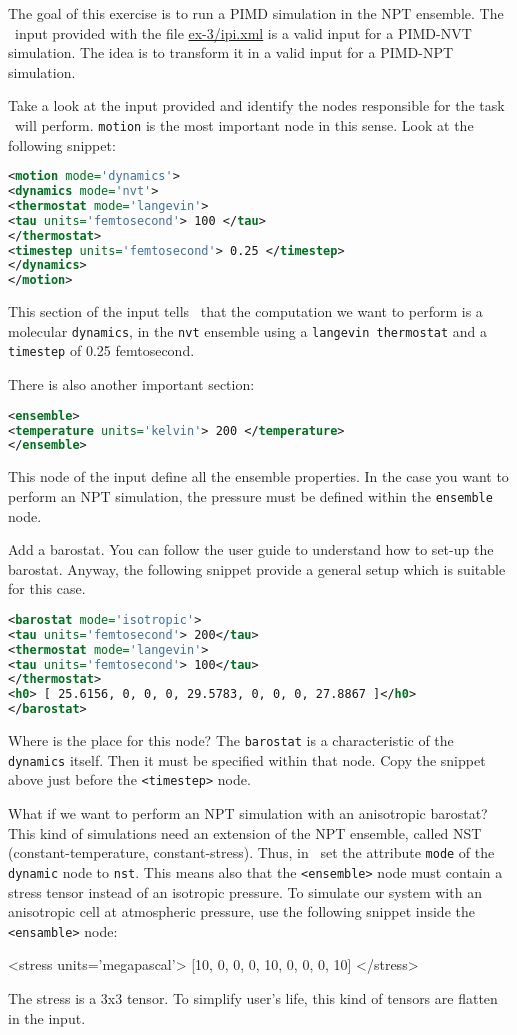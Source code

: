 \documentclass{article}
\begin{document}
\begin{Exercise}[label={inputs},title={PIMD-NPT simulation of ice}]
The goal of this exercise is to run a PIMD simulation in the NPT
ensemble. The \ipi\ input provided with the file \url{ex-3/ipi.xml} is
a valid input for a PIMD-NVT simulation. The idea is to transform it
in a valid input for a PIMD-NPT simulation.

\Question
Take a look at the input provided and identify the nodes responsible
for the task \ipi\ will perform.
\texttt{motion} is the most important node in this sense.
Look at the following snippet:
\begin{lstlisting}[language=xml]
<motion mode='dynamics'>
<dynamics mode='nvt'>
<thermostat mode='langevin'>
<tau units='femtosecond'> 100 </tau>
</thermostat>
<timestep units='femtosecond'> 0.25 </timestep>
</dynamics>
</motion>
\end{lstlisting}
This section of the input tells \ipi\ that the computation we want to
perform is a molecular \texttt{dynamics}, in the \texttt{nvt} ensemble
using a \texttt{langevin thermostat} and a \texttt{timestep} of 0.25
femtosecond.

There is also another important section:
\begin{lstlisting}[language=xml]
<ensemble>
<temperature units='kelvin'> 200 </temperature>
</ensemble>
\end{lstlisting}
This node of the input define all the ensemble properties. In the
case you want to perform an NPT simulation, the pressure must be
defined within the \texttt{ensemble} node.


\Question
Add a barostat. You can follow the user guide to understand how to
set-up the barostat. Anyway, the following snippet provide a general setup
which is suitable for this case.
\begin{lstlisting}[language=xml]
<barostat mode='isotropic'>
<tau units='femtosecond'> 200</tau>
<thermostat mode='langevin'>
<tau units='femtosecond'> 100</tau>
</thermostat>
<h0> [ 25.6156, 0, 0, 0, 29.5783, 0, 0, 0, 27.8867 ]</h0>
</barostat>
\end{lstlisting}
Where is the place for this node? The \texttt{barostat} is a
characteristic of the \texttt{dynamics} itself. Then it must be
specified within that node. Copy the snippet above just before the
\texttt{<timestep>} node.


\Question What if we want to perform an NPT simulation with an
anisotropic barostat? This kind of simulations need an extension of
the NPT ensemble, called NST (constant-temperature,
constant-stress). Thus, in \ipi\ set the attribute \texttt{mode} of
the \texttt{dynamic} node to \texttt{nst}. This means also that the
\texttt{<ensemble>} node must contain a stress tensor instead of an
isotropic pressure. To simulate our system with an anisotropic cell at
atmospheric pressure, use the following snippet inside the
\texttt{<ensamble>} node:
\begin{lstlisgin}[language=xml]
<stress units='megapascal'> [10, 0, 0, 0, 10, 0, 0, 0, 10] </stress>
\end{lstlisgin}
The stress is a 3x3 tensor. To simplify user's life, this kind of tensors are 
flatten in the \ipi input.


\end{Exercise}
\end{document}
